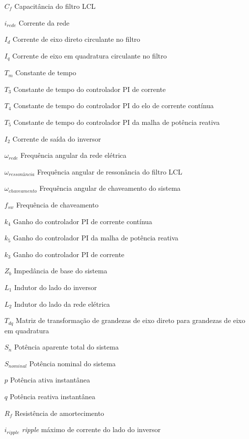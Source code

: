 \begin{simbolos}
  \item[$ C_f $] Capacitância do filtro LCL
  \item[$ i_{rede} $] Corrente da rede
  \item[$ I_d $] Corrente de eixo direto circulante no filtro
  \item[$ I_q $] Corrente de eixo em quadratura circulante no filtro
  \item[$ T_m $] Constante de tempo
  \item[$ T_3 $] Constante de tempo do controlador PI de corrente
  \item[$ T_4 $] Constante de tempo do controlador PI do elo de corrente contínua
  \item[$ T_5 $] Constante de tempo do controlador PI da malha de potência reativa
  \item[$ I_2 $] Corrente de saída do inversor
  \item[$ \omega_{rede} $] Frequência angular da rede elétrica
  \item[$ \omega_{ressonância} $] Frequência angular de ressonância do filtro LCL
  \item[$ \omega_{chaveamento} $] Frequência angular de chaveamento do sistema
  \item[$ f_{sw} $] Frequência de chaveamento
  \item[$ k_4 $] Ganho do controlador PI de corrente contínua
  \item[$ k_5 $] Ganho do controlador PI da malha de potência reativa
  \item[$ k_3 $] Ganho do controlador PI de corrente
  \item[$ Z_b $] Impedância de base do sistema
  \item[$ L_1 $] Indutor do lado do inversor
  \item[$ L_2 $] Indutor do lado da rede elétrica
  \item[$ T_{dq} $] Matriz de transformação de grandezas de eixo direto para grandezas de eixo em quadratura
  \item[$ S_n $] Potência aparente total do sistema
  \item[$ S_{nominal} $] Potência nominal do sistema
  \item[$ p $] Potência ativa instantânea
  \item[$ q $] Potência reativa instantânea
  \item[$ R_f $] Resistência de amortecimento
  \item[$ i_{ripple} $] \textit{ripple} máximo de corrente do lado do inversor

\end{simbolos}
